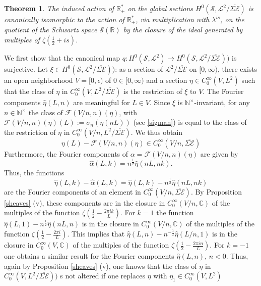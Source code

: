 \documentclass{pspum-l}
\newtheorem{theorem}{Theorem}[section]
\theoremstyle{definition}
\theoremstyle{remark}
\numberwithin{equation}{section}
\def\C{{\mathbb C}}
\def\R{{\mathbb R}}
\def\cE{{\mathcal E}}
\def\cF{{\mathcal F}}
\def\cL{{\mathcal L}}
\def\cS{{\mathcal S}}
\def\nt{\N^{\times}}
\def\N{{\mathbb N}}
\def\scal2{{\mathscr S}}
\begin{document}
 \begin{theorem}%
 The  induced action of $\R_+^*$ on the global sections $H^0(\scal2,\cL^2/\overline{\Sigma\cE})$   is canonically isomorphic to the  action of $\R_+^*$,  via multiplication with $\lambda^{is}$, on the quotient of the Schwartz space $\cS(\R)$ by the closure of the ideal generated by multiples of $\zeta\left(\frac 12 +is\right)$. 
 \end{theorem}
 \proof 
 We first show that the canonical map $q:H^0(\scal2,\cL^2)\to H^0(\scal2,\cL^2/\overline{\Sigma\cE}))$ is surjective. Let $\xi \in H^0(\scal2,\cL^2/\overline{\Sigma\cE}))$: as  a section of $\cL^2/\overline{\Sigma\cE}$ on $[0,\infty)$,  there exists an open neighborhood $V=[0,\epsilon)$ of $0\in [0,\infty)$ and a section $\eta\in C_0^{\infty}(V,L^2)$ such that the class of $\eta$ in $C_0^{\infty}(V,L^2/\overline{\Sigma\cE})$  is the restriction of $\xi$ to $V$. The Fourier components $\widehat \eta(L,n)$ are meaningful for $L\in V$. Since $\xi$ is $\nt$-invariant, for any $n\in \nt$ the class of $\cF(V/n,n)(\eta)$, with $\cF(V/n,n)(\eta)(L):= \sigma_n(\eta(nL))$ (see \eqref{sigman}) is equal to the class of the restriction of $\eta$ in $C_0^{\infty}(V/n,L^2/\overline{\Sigma\cE})$. We thus obtain 
\[
 \eta(L) -\cF(V/n,n)(\eta)\in C_0^{\infty}(V/n,\overline{\Sigma\cE})
 \]
 Furthermore, the Fourier components of $\alpha=\cF(V/n,n)(\eta)$ are given by 
 \[
 \widehat \alpha(L,k)=n^{\frac 12}\widehat \eta(nL,nk).
 \]
 Thus, the  functions 
 \[
 \widehat \eta(L,k)-\widehat \alpha(L,k)=  \widehat \eta(L,k)-n^{\frac 12}\widehat \eta(nL,nk)
 \]
 are the Fourier components of an element in  $C_0^{\infty}(V/n,\overline{\Sigma\cE})$. 
  By Proposition \ref{sheaves} (v),  these components are in the closure  in $C_0^{\infty}(V/n,\C)$ of the multiples of the function $\zeta\left(\frac 12-\frac{2\pi i k}{L}\right)$. For $k=1$  the function $\widehat \eta(L,1)-n^{\frac 12}\widehat \eta(nL,n)$ is in the closure  in $C_0^{\infty}(V/n,\C)$ of the multiples of the function $\zeta\left(\frac 12-\frac{2\pi i }{L}\right)$. This implies that  $\widehat \eta(L,n)-n^{-\frac 12}\widehat \eta(L/n,1)$ is in the closure  in $C_0^{\infty}(V,\C)$ of the multiples of the function $\zeta\left(\frac 12-\frac{2\pi in }{L}\right)$. For $k=-1$ one obtains  a similar result for the Fourier components $\widehat \eta(L,n)$, $n<0$. Thus, again by Proposition \ref{sheaves} (v), one knows that  the class of $\eta$  in $C_0^{\infty}(V,L^2/\overline{\Sigma\cE}))$ s not altered if one replaces $\eta$ with $\eta_1\in C_0^{\infty}(V,L^2)$  
\end{document}
